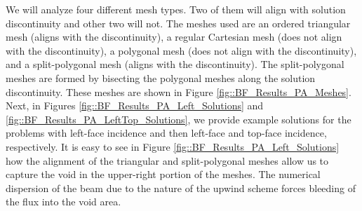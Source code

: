 We will analyze four different mesh types. Two of them will align with solution discontinuity and other two will not. The meshes used are an ordered triangular mesh (aligns with the discontinuity), a regular Cartesian mesh (does not align with the discontinuity), a polygonal mesh (does not align with the discontinuity), and a split-polygonal mesh (aligns with the discontinuity). The split-polygonal meshes are formed by bisecting the polygonal meshes along the solution discontinuity. These meshes are shown in Figure \ref{fig::BF_Results_PA_Meshes}. Next, in Figures \ref{fig::BF_Results_PA_Left_Solutions} and \ref{fig::BF_Results_PA_LeftTop_Solutions}, we provide example solutions for the problems with left-face incidence and then left-face and top-face incidence, respectively. It is easy to see in Figure \ref{fig::BF_Results_PA_Left_Solutions} how the alignment of the triangular and split-polygonal meshes allow us to capture the void in the upper-right portion of the meshes. The numerical dispersion of the beam due to the nature of the upwind scheme forces bleeding of the flux into the void area.



